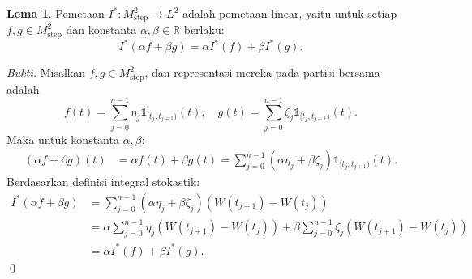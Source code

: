 \documentclass[aspectratio=169,11pt]{beamer}
\theoremstyle{definition}
\newtheorem{lema}{Lema}
\newcommand{\R}{\mathbb{R}}
\begin{document}
\begin{frame}[allowframebreaks]{\insertsection}{\insertsubsection}
  \begin{lema}
    Pemetaan $I^* : M_{\text{step}}^2 \to L^2$ adalah pemetaan linear, yaitu untuk setiap $f, g \in M_{\text{step}}^2$ dan konstanta $\alpha, \beta \in \R$ berlaku:
    \begin{equation*}
      I^*(\alpha f + \beta g) = \alpha I^*(f) + \beta I^*(g).
    \end{equation*}
  \end{lema}
  \textit{Bukti.} Misalkan $f, g \in M_{\text{step}}^2$, dan representasi mereka pada partisi bersama adalah
  \begin{equation*}
    f(t) = \sum_{j=0}^{n-1} \eta_j \mathds{1}_{[t_j, t_{j+1})}(t), \quad g(t) = \sum_{j=0}^{n-1} \zeta_j \mathds{1}_{[t_j, t_{j+1})}(t).
  \end{equation*}
  Maka untuk konstanta $\alpha, \beta$:
  \begin{align*}
    (\alpha f + \beta g)(t) & = \alpha f(t) + \beta g(t) = \sum_{j=0}^{n-1} (\alpha \eta_j + \beta \zeta_j) \mathds{1}_{[t_j, t_{j+1})}(t).
  \end{align*}
  Berdasarkan definisi integral stokastik:
  \begin{align*}
    I^*(\alpha f + \beta g) & = \sum_{j=0}^{n-1} (\alpha \eta_j + \beta \zeta_j)(W(t_{j+1}) - W(t_j))                                       \\
                            & = \alpha \sum_{j=0}^{n-1} \eta_j (W(t_{j+1}) - W(t_j)) + \beta \sum_{j=0}^{n-1} \zeta_j (W(t_{j+1}) - W(t_j)) \\
                            & = \alpha I^*(f) + \beta I^*(g).
  \end{align*}
  \qed
\end{frame}
\end{document}

